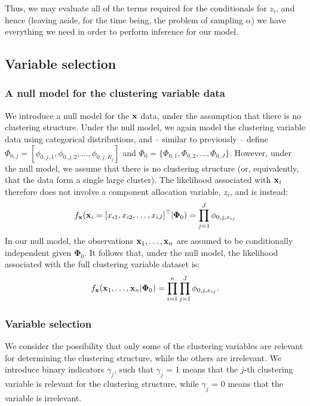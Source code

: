 \documentclass[12pt]{article}
\begin{document}
Thus, we may evaluate all of the terms required for the conditionals for $z_i$, and hence (leaving aside, for the time being, the problem of sampling $\alpha$) we have everything we need in order to perform inference for our model.  

\subsection{Variable selection}\label{variableSelection}
\subsubsection{A null model for the clustering variable data}
We introduce a null model for the ${\bf x}$ data, under the assumption that there is no clustering structure.  Under the null model, we again model the clustering variable data using categorical distributions, and -- similar to previously -- define $\Phi_{0,j} = [\phi_{0,j,1}, \phi_{0,j,2}, \ldots, \phi_{0,j,R_j} ]$ and $\Phi_{0} = \{\Phi_{0,1}, \Phi_{0,2}, \ldots, \Phi_{0,J}\}$.  However, under the null model, we assume that there is no clustering structure (or, equivalently, that the data form a single large cluster).  The likelihood associated with ${\bf x}_i$ therefore does not involve a component allocation variable, $z_i$, and is instead:
\begin{align}      
 f_{\bf x}({\bf x}_i = [x_{i1}, x_{i2}, \ldots, x_{iJ}]^\top|\boldsymbol{\Phi}_0)
 = \prod_{j = 1}^J  \phi_{0,j,x_{ij}}\label{likeliprodnull}
\end{align}
In our null model, the observations ${\bf x}_1, \ldots, {\bf x}_n$ are assumed to be conditionally independent given $\boldsymbol{\Phi}_0$.  It follows that, under the null model, the likelihood associated with the full clustering variable dataset is:
\begin{align}      
 f_{\bf x}({\bf x}_1, \ldots, {\bf x}_n|\boldsymbol{\Phi}_0) = \prod_{i = 1}^n \prod_{j = 1}^J  \phi_{0,j,x_{ij}}.\label{likeliprodnullfull}
\end{align}
 

\subsubsection{Variable selection}
We consider the possibility that only some of the clustering variables are relevant for determining the clustering structure, while the others are irrelevant.  We introduce binary indicators $\gamma_j$, such that $\gamma_j$ = 1 means that the $j$-th clustering variable is relevant for the clustering structure, while $\gamma_j$ = 0 means that the variable is irrelevant.  
\end{document}
